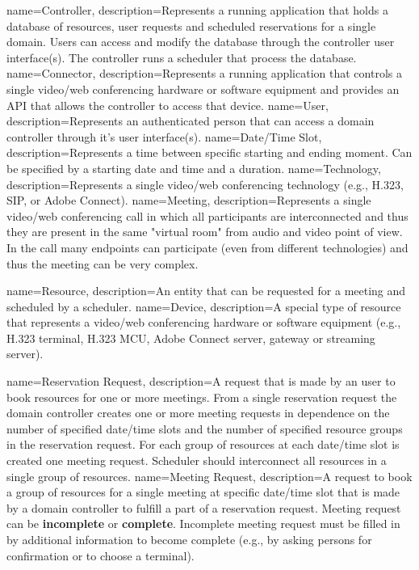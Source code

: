 %
%
{
  name=Controller,
  description={Represents a running application that holds a database of resources, 
    user requests and scheduled reservations for a single domain. Users can access and 
    modify the database through the controller user interface(s). The controller runs a 
    scheduler that process the database.}
}
{
  name=Connector,
  description={Represents a running application that controls a single video/web 
  conferencing hardware or software equipment and provides an API that allows 
  the controller to access that device.}
}
{
  name=User,
  description={Represents an authenticated person that can access a domain controller
    through it's user interface(s).}
}
{
  name=Date/Time Slot,
  description={Represents a time between specific starting and ending moment. Can be 
    specified by a starting date and time and a duration.}
}
{
  name=Technology,
  description={Represents a single video/web conferencing technology (e.g., H.323, SIP,
  or Adobe Connect).}
}
{
  name=Meeting,
  description={Represents a single video/web conferencing call in which all participants 
  are interconnected and thus they are present in the same "virtual room" from audio and 
  video point of view. In the call many endpoints can participate (even from different 
  technologies) and thus the meeting can be very complex.}
}

%
%
{
  name=Resource,
  description={An entity that can be requested for a meeting and scheduled by a scheduler.}
}
{
  name=Device,
  description={A special type of resource that represents a video/web conferencing 
  hardware or software equipment (e.g., H.323 terminal, H.323 MCU, Adobe Connect 
  server, gateway or streaming server).}
}

%
%
{
  name=Reservation Request,
  description={A request that is made by an user to book resources for one or more meetings. 
    From a single reservation request the domain controller creates one or more meeting 
    requests in dependence on the number of specified date/time slots and the number of 
    specified resource groups in the reservation request. For each group of resources
    at each date/time slot is created one meeting request. Scheduler should interconnect 
    all resources in a single group of resources.}
}
{
  name=Meeting Request,
  description={A request to book a group of resources for a single meeting at specific 
    date/time slot that is made by a domain controller to fulfill a part of a reservation 
    request. Meeting request can be \textbf{incomplete} or \textbf{complete}. Incomplete 
    meeting request must be filled in by additional information to become complete 
    (e.g., by asking persons for confirmation or to choose a terminal).}
}

